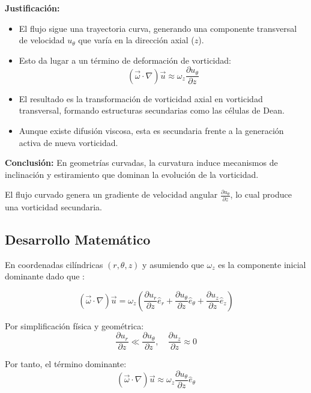 \documentclass{article}
\begin{document}
\textbf{Justificación:}
\begin{itemize}
    \item El flujo sigue una trayectoria curva, generando una componente transversal de velocidad $u_\theta$ que varía en la dirección axial ($z$).
    \item Esto da lugar a un término de deformación de vorticidad:
    \[
    (\vec{\omega} \cdot \nabla)\vec{u} \approx \omega_z \frac{\partial u_\theta}{\partial z}
    \]
    \item El resultado es la transformación de vorticidad axial en vorticidad transversal, formando estructuras secundarias como las células de Dean.
    \item Aunque existe difusión viscosa, esta es secundaria frente a la generación activa de nueva vorticidad.
\end{itemize}

\textbf{Conclusión:} En geometrías curvadas, la curvatura induce mecanismos de inclinación y estiramiento que dominan la evolución de la vorticidad.

\vspace{1em}

El flujo curvado genera un gradiente de velocidad angular $\frac{\partial u_\theta}{\partial z}$, lo cual produce una vorticidad secundaria.

\subsection{Desarrollo Matemático}
En coordenadas cilíndricas $(r,\theta,z)$ y asumiendo que $\omega_z$ es la componente inicial dominante dado que :

\begin{equation}
    (\vec{\omega} \cdot \nabla)\vec{u} = \omega_z \left(
        \frac{\partial u_r}{\partial z} \hat{e}_r +
        \frac{\partial u_\theta}{\partial z} \hat{e}_\theta +
        \frac{\partial u_z}{\partial z} \hat{e}_z
    \right)
\end{equation}

Por simplificación física y geométrica:
\[
\frac{\partial u_r}{\partial z} \ll \frac{\partial u_\theta}{\partial z}, \quad \frac{\partial u_z}{\partial z} \approx 0
\]

Por tanto, el término dominante:
\begin{equation}
    (\vec{\omega} \cdot \nabla)\vec{u} \approx \omega_z \frac{\partial u_\theta}{\partial z} \hat{e}_\theta
\end{equation}
\end{document}
